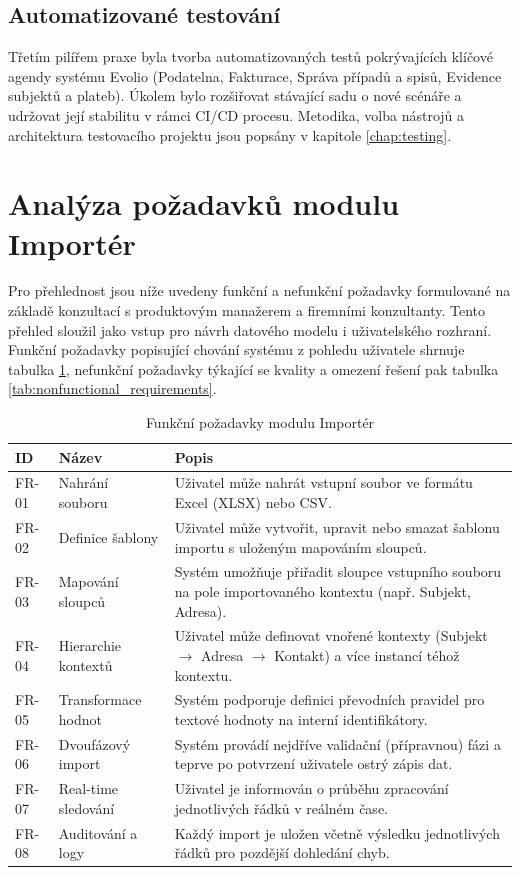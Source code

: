 \subsection{Automatizované testování}
Třetím pilířem praxe byla tvorba automatizovaných testů pokrývajících klíčové agendy systému Evolio (Podatelna, Fakturace, Správa případů a spisů, Evidence subjektů a plateb). Úkolem bylo rozšiřovat stávající sadu o nové scénáře a udržovat její stabilitu v rámci CI/CD procesu. Metodika, volba nástrojů a architektura testovacího projektu jsou popsány v kapitole \ref{chap:testing}.

\section{Analýza požadavků modulu Importér}
\label{sec:requirements}

Pro přehlednost jsou níže uvedeny funkční a nefunkční požadavky formulované na základě konzultací s produktovým manažerem a firemními konzultanty. Tento přehled sloužil jako vstup pro návrh datového modelu i uživatelského rozhraní. Funkční požadavky popisující chování systému z pohledu uživatele shrnuje tabulka \ref{tab:functional_requirements}, nefunkční požadavky týkající se kvality a omezení řešení pak tabulka \ref{tab:nonfunctional_requirements}.

\begin{table}[!htbp]
\centering
\caption{Funkční požadavky modulu Importér}
\label{tab:functional_requirements}
\begin{tabular}{|l|p{3.3cm}|p{7.2cm}|}
\hline
\textbf{ID} & \textbf{Název} & \textbf{Popis} \\ \hline
FR-01 & Nahrání souboru & Uživatel může nahrát vstupní soubor ve formátu Excel (XLSX) nebo CSV. \\ \hline
FR-02 & Definice šablony & Uživatel může vytvořit, upravit nebo smazat šablonu importu s uloženým mapováním sloupců. \\ \hline
FR-03 & Mapování sloupců & Systém umožňuje přiřadit sloupce vstupního souboru na pole importovaného kontextu (např. Subjekt, Adresa). \\ \hline
FR-04 & Hierarchie kontextů & Uživatel může definovat vnořené kontexty (Subjekt $\rightarrow$ Adresa $\rightarrow$ Kontakt) a více instancí téhož kontextu. \\ \hline
FR-05 & Transformace hodnot & Systém podporuje definici převodních pravidel pro textové hodnoty na interní identifikátory. \\ \hline
FR-06 & Dvoufázový import & Systém provádí nejdříve validační (přípravnou) fázi a teprve po potvrzení uživatele ostrý zápis dat. \\ \hline
FR-07 & Real-time sledování & Uživatel je informován o průběhu zpracování jednotlivých řádků v reálném čase. \\ \hline
FR-08 & Auditování a logy & Každý import je uložen včetně výsledku jednotlivých řádků pro pozdější dohledání chyb. \\ \hline
\end{tabular}
\end{table}

